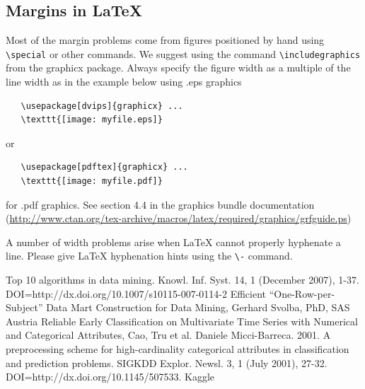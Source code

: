 \documentclass{article} %
\begin{document}
\subsection{Margins in LaTeX}
 
Most of the margin problems come from figures positioned by hand using
\verb+\special+ or other commands. We suggest using the command
\verb+\includegraphics+
from the graphicx package. Always specify the figure width as a multiple of
the line width as in the example below using .eps graphics
\begin{verbatim}
   \usepackage[dvips]{graphicx} ... 
   \texttt{[image: myfile.eps]} 
\end{verbatim}
or %
\begin{verbatim}
   \usepackage[pdftex]{graphicx} ... 
   \texttt{[image: myfile.pdf]} 
\end{verbatim}
for .pdf graphics. 
See section 4.4 in the graphics bundle documentation (\url{http://www.ctan.org/tex-archive/macros/latex/required/graphics/grfguide.ps}) 
 
A number of width problems arise when LaTeX cannot properly hyphenate a
line. Please give LaTeX hyphenation hints using the \verb+\-+ command.





\begin{thebibliography}{100} %
	 Top 10 algorithms in data mining. Knowl. Inf. Syst. 14, 1 (December 2007), 1-37. DOI=http://dx.doi.org/10.1007/s10115-007-0114-2
	 Efficient “One-Row-per-Subject” Data Mart Construction for Data Mining, Gerhard Svolba, PhD, SAS Austria
	 Reliable Early Classification on Multivariate Time Series with Numerical and Categorical Attributes, Cao, Tru et al.
	Daniele Micci-Barreca. 2001. A preprocessing scheme for high-cardinality categorical attributes in classification and prediction problems. SIGKDD Explor. Newsl. 3, 1 (July 2001), 27-32. DOI=http://dx.doi.org/10.1145/507533.
	Kaggle
\end{thebibliography}
\end{document}
